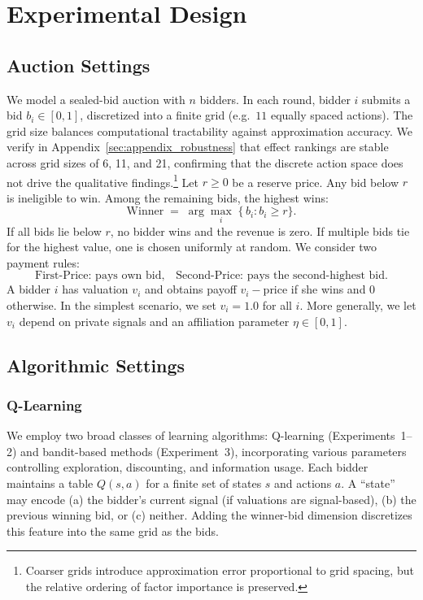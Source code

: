 \section{Experimental Design}

\subsection{Auction Settings}
We model a sealed-bid auction with $n$ bidders. In each round, bidder $i$ submits a bid $b_i \in [0,1]$, discretized into a finite grid (e.g.\ $11$ equally spaced actions). The grid size balances computational tractability against approximation accuracy. We verify in Appendix~\ref{sec:appendix_robustness} that effect rankings are stable across grid sizes of 6, 11, and 21, confirming that the discrete action space does not drive the qualitative findings.\footnote{Coarser grids introduce approximation error proportional to grid spacing, but the relative ordering of factor importance is preserved.} Let $r \ge 0$ be a reserve price. Any bid below $r$ is ineligible to win. Among the remaining bids, the highest wins:
\[
\text{Winner} \;=\;\arg\max_i\; \{\,b_i : b_i \ge r\}.
\]
If all bids lie below $r$, no bidder wins and the revenue is zero. If multiple bids tie for the highest value, one is chosen uniformly at random. We consider two payment rules:
\[
\text{First-Price: pays own bid,}
\quad
\text{Second-Price: pays the second-highest bid.}
\]
A bidder $i$ has valuation $v_i$ and obtains payoff $v_i - \text{price}$ if she wins and $0$ otherwise. In the simplest scenario, we set $v_i = 1.0$ for all $i$. More generally, we let $v_i$ depend on private signals and an affiliation parameter $\eta \in [0,1]$.

\subsection{Algorithmic Settings}

\subsubsection{Q-Learning}
We employ two broad classes of learning algorithms: Q-learning (Experiments~1--2) and bandit-based methods (Experiment~3), incorporating various parameters controlling exploration, discounting, and information usage. Each bidder maintains a table $Q(s,a)$ for a finite set of states $s$ and actions $a$. A “state” may encode (a) the bidder’s current signal (if valuations are signal-based), (b) the previous winning bid, or (c) neither. Adding the winner-bid dimension discretizes this feature into the same grid as the bids.

